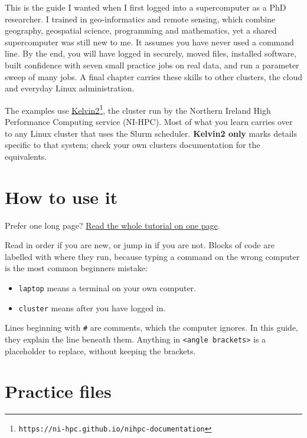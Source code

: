 This is the guide I wanted when I first logged into a supercomputer as a PhD researcher. I trained in geo-informatics and remote sensing, which combine geography, geospatial science, programming and mathematics, yet a shared supercomputer was still new to me. It assumes you have never used a command line. By the end, you will have logged in securely, moved files, installed software, built confidence with seven small practice jobs on real data, and run a parameter sweep of many jobs. A final chapter carries these skills to other clusters, the cloud and everyday Linux administration.

The examples use \href{https://ni-hpc.github.io/nihpc-documentation}{Kelvin2}\footnote{\texttt{https://ni-hpc.github.io/nihpc-documentation}}, the cluster run by the Northern Ireland High Performance Computing service (NI-HPC). Most of what you learn carries over to any Linux cluster that uses the Slurm scheduler. \textbf{Kelvin2 only} marks details specific to that system; check your own cluster\textquotesingle s documentation for the equivalents.

\section{How to use it}\label{how-to-use-it}

Prefer one long page? \href{full/}{Read the whole tutorial on one page}.

Read in order if you are new, or jump in if you are not. Blocks of code are labelled with where they run, because typing a command on the wrong computer is the most common beginner\textquotesingle s mistake:

\begin{itemize}
\tightlist
\item
  \texttt{laptop} means a terminal on your own computer.
\item
  \texttt{cluster} means after you have logged in.
\end{itemize}

Lines beginning with \texttt{\#} are comments, which the computer ignores. In this guide, they explain the line beneath them. Anything in \texttt{\textless{}angle\ brackets\textgreater{}} is a placeholder to replace, without keeping the brackets.

\section{Practice files}\label{practice-files}

